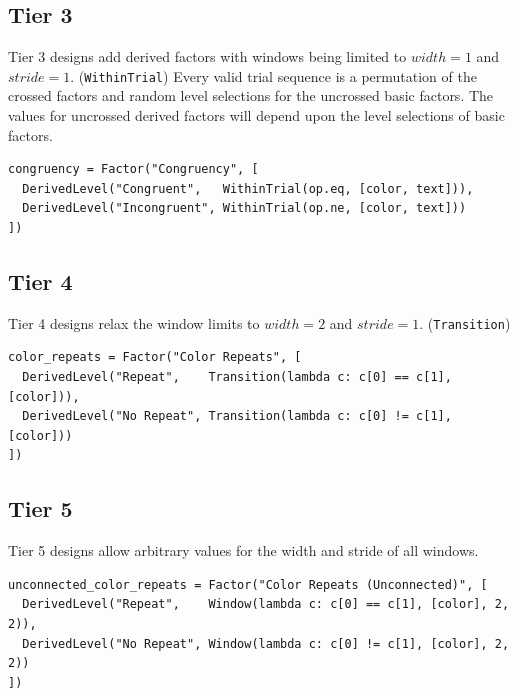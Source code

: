 \subsection{Tier 3}

Tier 3 designs add derived factors with windows being limited to $width=1$ and $stride=1$. (\texttt{WithinTrial}) Every valid trial sequence is a permutation of the crossed factors and random level selections for the uncrossed basic factors. The values for uncrossed derived factors will depend upon the level selections of basic factors.

\begin{verbatim}
congruency = Factor("Congruency", [
  DerivedLevel("Congruent",   WithinTrial(op.eq, [color, text])),
  DerivedLevel("Incongruent", WithinTrial(op.ne, [color, text]))
])
\end{verbatim}

\subsection{Tier 4}

Tier 4 designs relax the window limits to $width=2$ and $stride=1$. (\texttt{Transition})

\begin{verbatim}
color_repeats = Factor("Color Repeats", [
  DerivedLevel("Repeat",    Transition(lambda c: c[0] == c[1], [color])),
  DerivedLevel("No Repeat", Transition(lambda c: c[0] != c[1], [color]))
])
\end{verbatim}


\subsection{Tier 5}

Tier 5 designs allow arbitrary values for the width and stride of all windows.

\begin{verbatim}
unconnected_color_repeats = Factor("Color Repeats (Unconnected)", [
  DerivedLevel("Repeat",    Window(lambda c: c[0] == c[1], [color], 2, 2)),
  DerivedLevel("No Repeat", Window(lambda c: c[0] != c[1], [color], 2, 2))
])
\end{verbatim}

